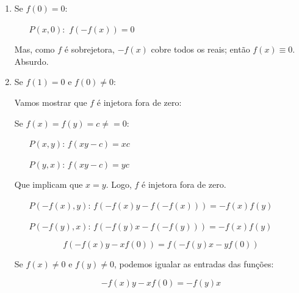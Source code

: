 \documentclass[10pt,a4paper]{article}
\begin{document}
	\begin{enumerate}[label = (Caso (\alph*))]
		\item Se $f(0) = 0$:
			\begin{enumerate}
				\item[$P(x,0):$] $f(-f(x)) = 0$
			\end{enumerate}

			Mas, como $f$ é sobrejetora, $-f(x)$ cobre todos os reais; então $f(x) \equiv 0$. Absurdo.
		
		\item Se $f(1) = 0$ e $f(0) \neq 0$:

			Vamos mostrar que $f$ é injetora fora de zero:

			Se $f(x) = f(y) = c \neq = 0$:
	
			\begin{enumerate}
				\item[$P(x,y)$:] $f(xy - c) = xc$ 
				\item[$P(y,x)$:] $f(xy - c) = yc$
			\end{enumerate}

			Que implicam que $x = y$. Logo, $f$ é injetora fora de zero.
			
			\begin{enumerate}
				\item[$P(-f(x),y)$:] $f(-f(x)y-f(-f(x))) = -f(x)f(y)$
				\item[$P(-f(y),x)$:] $f(-f(y)x-f(-f(y))) = -f(x)f(y)$
			\end{enumerate}

			$$ f(-f(x)y - xf(0)) = f(-f(y)x - yf(0)) $$
			
			Se $f(x) \neq 0$ e $f(y) \neq 0$, podemos igualar as entradas das funções:

			$$ -f(x)y - xf(0) = -f(y)x $$

	\end{enumerate}

	
\end{document}
